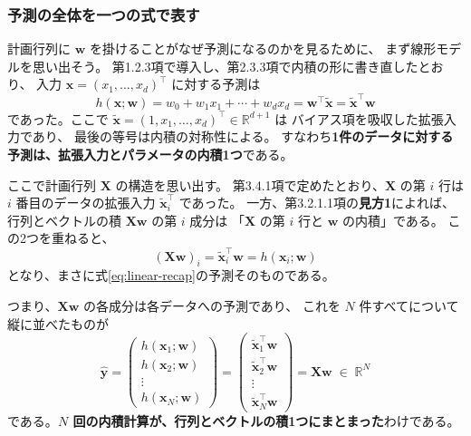 \subsubsection{予測の全体を一つの式で表す}


計画行列に $\bm{w}$ を掛けることがなぜ予測になるのかを見るために、
まず線形モデルを思い出そう。
第1.2.3項で導入し、第2.3.3項で内積の形に書き直したとおり、
入力 $\bm{x} = (x_1, \ldots, x_d)^\top$ に対する予測は
\begin{equation}
  h(\bm{x}; \bm{w}) = w_0 + w_1 x_1 + \cdots + w_d x_d
  = \bm{w}^\top \tilde{\bm{x}}
  = \tilde{\bm{x}}^\top \bm{w}
  \label{eq:linear-recap}
\end{equation}
であった。ここで $\tilde{\bm{x}} = (1, x_1, \ldots, x_d)^\top \in \mathbb{R}^{d+1}$ は
バイアス項を吸収した拡張入力であり、
最後の等号は内積の対称性による。
すなわち\textbf{1件のデータに対する予測は、拡張入力とパラメータの内積1つ}である。


ここで計画行列 $\bm{X}$ の構造を思い出す。
第3.4.1項で定めたとおり、$\bm{X}$ の第 $i$ 行は $i$ 番目のデータの拡張入力 $\tilde{\bm{x}}_i^\top$ であった。
一方、第3.2.1.1項の\textbf{見方1}によれば、
行列とベクトルの積 $\bm{X}\bm{w}$ の第 $i$ 成分は
「$\bm{X}$ の第 $i$ 行と $\bm{w}$ の内積」である。
この2つを重ねると、
\begin{equation}
  (\bm{X}\bm{w})_i = \tilde{\bm{x}}_i^\top \bm{w} = h(\bm{x}_i; \bm{w})
\end{equation}
となり、まさに式\eqref{eq:linear-recap}の予測そのものである。

つまり、$\bm{X}\bm{w}$ の各成分は各データへの予測であり、
これを $N$ 件すべてについて縦に並べたものが
\begin{equation}
  \hat{\bm{y}} =
  \begin{pmatrix} h(\bm{x}_1; \bm{w}) \\ h(\bm{x}_2; \bm{w}) \\ \vdots \\ h(\bm{x}_N; \bm{w}) \end{pmatrix}
  = \begin{pmatrix} \tilde{\bm{x}}_1^\top \bm{w} \\ \tilde{\bm{x}}_2^\top \bm{w} \\ \vdots \\ \tilde{\bm{x}}_N^\top \bm{w} \end{pmatrix}
  = \bm{X}\bm{w} \;\in\; \mathbb{R}^N
  \label{eq:yhat}
\end{equation}
である。\textbf{$N$ 回の内積計算が、行列とベクトルの積1つにまとまった}わけである。

